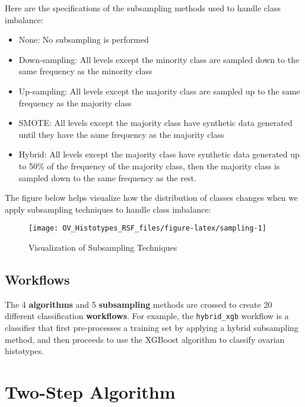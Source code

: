 \documentclass[
]{report}
\providecommand{\tightlist}{%
  \setlength{\itemsep}{0pt}\setlength{\parskip}{0pt}}
\begin{document}
Here are the specifications of the subsampling methods used to handle class imbalance:

\begin{itemize}
\tightlist
\item
  None: No subsampling is performed
\item
  Down-sampling: All levels except the minority class are sampled down to the same frequency as the minority class
\item
  Up-sampling: All levels except the majority class are sampled up to the same frequency as the majority class
\item
  SMOTE: All levels except the majority class have synthetic data generated until they have the same frequency as the majority class
\item
  Hybrid: All levels except the majority class have synthetic data generated up to 50\% of the frequency of the majority class, then the majority class is sampled down to the same frequency as the rest.
\end{itemize}

The figure below helps visualize how the distribution of classes changes when we apply subsampling techniques to handle class imbalance:

\begin{figure}[H]

{\centering \texttt{[image: OV\_Histotypes\_RSF\_files/figure-latex/sampling-1]} 

}

\caption{Visualization of Subsampling Techniques}\label{fig:sampling}
\end{figure}

\hypertarget{workflows}{%
\subsection{Workflows}\label{workflows}}

The 4 \textbf{algorithms} and 5 \textbf{subsampling} methods are crossed to create 20 different classification \textbf{workflows}. For example, the \texttt{hybrid\_xgb} workflow is a classifier that first pre-processes a training set by applying a hybrid subsampling method, and then proceeds to use the XGBoost algorithm to classify ovarian histotypes.

\hypertarget{two-step-algorithm}{%
\section{Two-Step Algorithm}\label{two-step-algorithm}}
\end{document}
